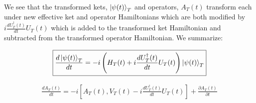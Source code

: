 \documentclass[12pt]{article}
\newcommand{\ddt}[1]{\frac{d #1}{dt}}
\begin{document}
We see that the transformed kets, $\ket{\psi(t)}_T$ and operators, $A_T(t)$ transform each under new effective ket and operator Hamiltonians which are both modified by $i\ddt{U_T^{\dag}(t)}U_T(t)$ which is added to the transformed ket Hamiltonian and subtracted from the transformed operator Hamiltonian. We summarize:

\begin{align}
\boxed{\ddt{\ket{\psi(t)}_T} = -i \left(H_T(t) + i\ddt{U_T^{\dag}(t)}U_T(t) \right) \ket{\psi(t)}_T}
\end{align}

\begin{align}
\boxed{
	\ddt{A_T(t)} = -i\left[A_T(t), V_T(t) -i\ddt{U_T^{\dag}(t)}U_T(t) \right] + \frac{\partial A_T(t)}{\partial t}
}
\end{align}
\end{document}
